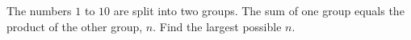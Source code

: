 The numbers $1$ to $10$ are split into two groups. The sum of one group equals the product of the other group, $n$. Find the largest possible $n$.
